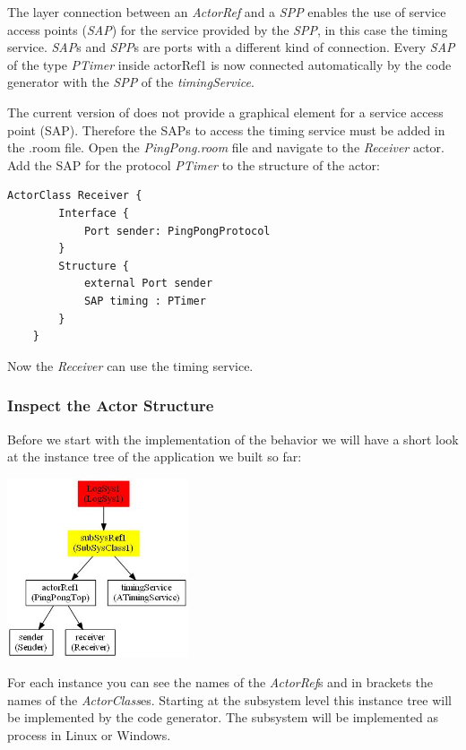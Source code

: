 The layer connection between an \emph{ActorRef} and a \emph{SPP} enables the use of service access points (\emph{SAP}) for the service provided by the \emph{SPP}, in this case the timing service. \emph{SAP}s and \emph{SPP}s are ports with a different kind of connection. Every \emph{SAP} of the type \emph{PTimer} inside actorRef1 is now connected automatically by the code generator with the \emph{SPP} of the \emph{timingService}.

The current version of \eTrice{} does not provide a graphical element for a service access point (SAP). 
Therefore the SAPs to access the timing service must be added in the .room file. Open the 
\textit{PingPong.room} file and navigate to the \textit{Receiver} actor. Add the SAP for the protocol \emph{PTimer} to the structure of the actor:

\begin{lstlisting}[language=ROOM]
	ActorClass Receiver {
		Interface {
			Port sender: PingPongProtocol
		}
		Structure {
			external Port sender
			SAP timing : PTimer
		}
	}
\end{lstlisting}

Now the \emph{Receiver} can use the timing service.

\subsubsection{Inspect the Actor Structure}
Before we start with the implementation of the behavior we will have a short look at the instance tree of the application we built so far:

\includegraphics[width=0.4\textwidth]{images/017-09-PingPong_InstanceTree.jpg}

For each instance you can see the names of the \emph{ActorRef}s and in brackets the names of the \emph{ActorClass}es. Starting at the subsystem level this instance tree will be implemented by the code generator. The subsystem will be implemented as process in Linux or Windows.


